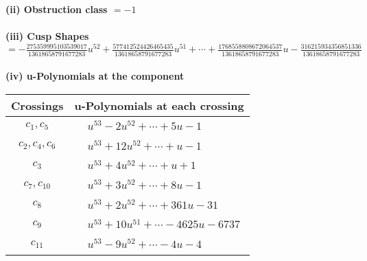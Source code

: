 \documentclass[1p]{elsarticle_modified}
\theoremstyle{definition}
\begin{document}
\flushleft \textbf{(ii) Obstruction class $= -1$}\\~\\
\flushleft \textbf{(iii) Cusp Shapes $= -\frac{275359995103539017}{13618658791677283} u^{52}+\frac{577412524426465435}{13618658791677283} u^{51}+\cdots+\frac{1768558808672064537}{13618658791677283} u-\frac{316215934356851336}{13618658791677283}$}\\~\\
\newpage\renewcommand{\arraystretch}{1}
\flushleft \textbf{(iv) u-Polynomials at the component}\newline \\
\begin{tabular}{m{50pt}|m{274pt}}
Crossings & \hspace{64pt}u-Polynomials at each crossing \\
\hline $$\begin{aligned}c_{1},c_{5}\end{aligned}$$&$\begin{aligned}
&u^{53}-2 u^{52}+\cdots+5 u-1
\end{aligned}$\\
\hline $$\begin{aligned}c_{2},c_{4},c_{6}\end{aligned}$$&$\begin{aligned}
&u^{53}+12 u^{52}+\cdots+u-1
\end{aligned}$\\
\hline $$\begin{aligned}c_{3}\end{aligned}$$&$\begin{aligned}
&u^{53}+4 u^{52}+\cdots+u+1
\end{aligned}$\\
\hline $$\begin{aligned}c_{7},c_{10}\end{aligned}$$&$\begin{aligned}
&u^{53}+3 u^{52}+\cdots+8 u-1
\end{aligned}$\\
\hline $$\begin{aligned}c_{8}\end{aligned}$$&$\begin{aligned}
&u^{53}+2 u^{52}+\cdots+361 u-31
\end{aligned}$\\
\hline $$\begin{aligned}c_{9}\end{aligned}$$&$\begin{aligned}
&u^{53}+10 u^{51}+\cdots-4625 u-6737
\end{aligned}$\\
\hline $$\begin{aligned}c_{11}\end{aligned}$$&$\begin{aligned}
&u^{53}-9 u^{52}+\cdots-4 u-4
\end{aligned}$\\
\hline
\end{tabular}\\~\\
\end{document}
